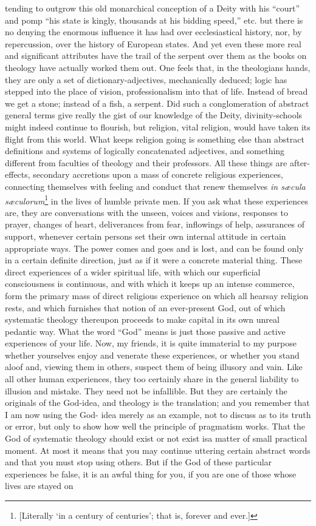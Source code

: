 \documentclass[]{article}
\begin{document}
tending to outgrow this old monarchical conception of a Deity with his ``court'' and pomp ``his state is kingly, thousands at his bidding speed,'' etc. but there is no denying the enormous influence it has had over ecclesiastical history, nor, by repercussion, over the history of European states. And yet even these more real and significant attributes have the trail of the serpent over them as the books on theology have actually worked them out. One feels that, in the theologians hands, they are only a set of dictionary-adjectives, mechanically deduced; logic has stepped into the place of vision, professionalism into that of life. Instead of bread we get a stone; instead of a fish, a serpent. Did such a conglomeration of abstract general terms give really the gist of our knowledge of the Deity, divinity-schools might indeed continue to flourish, but religion, vital religion, would have taken its flight from this world. What keeps religion going is something else than abstract definitions and systems of logically concatenated adjectives, and something different from faculties of theology and their professors. All these things are after-effects, secondary accretions upon a mass of concrete religious experiences, connecting themselves with feeling and conduct that renew themselves \emph{in s{\ae}cula s{\ae}culorum}\footnote{[Literally `in a century of centuries'; that is, forever and ever.]} in the lives of humble private men. If you ask what these experiences are, they are conversations with the unseen, voices and visions, responses to prayer, changes of heart, deliverances from fear, inflowings of help, assurances of support, whenever certain persons set their own internal attitude in certain appropriate ways. The power comes and goes and is lost, and can be found only in a certain definite direction, just as if it were a concrete material thing. These direct experiences of a wider spiritual life, with which our superficial consciousness is continuous, and with which it keeps up an intense commerce, form the primary mass of direct religious experience on which all hearsay religion rests, and which furnishes that notion of an ever-present God, out of which systematic theology thereupon proceeds to make capital in its own unreal pedantic way. What the word ``God'' means is just those passive and active experiences of your life. Now, my friends, it is quite immaterial to my purpose whether yourselves enjoy and venerate these experiences, or whether you stand aloof and, viewing them in others, suspect them of being illusory and vain. Like all other human experiences, they too certainly share in the general liability to illusion and mistake. They need not be infallible. But they are certainly the originals of the God-idea, and theology is the translation; and you remember that I am now using the God- idea merely as an example, not to discuss as to its truth or error, but only to show how well the principle of pragmatism works. That the God of systematic theology should exist or not exist isa matter of small practical moment. At most it means that you may continue uttering certain abstract words and that you must stop using others. But if the God of these particular experiences be false, it is an awful thing for you, if you are one of those whose lives are stayed on 
\end{document}
